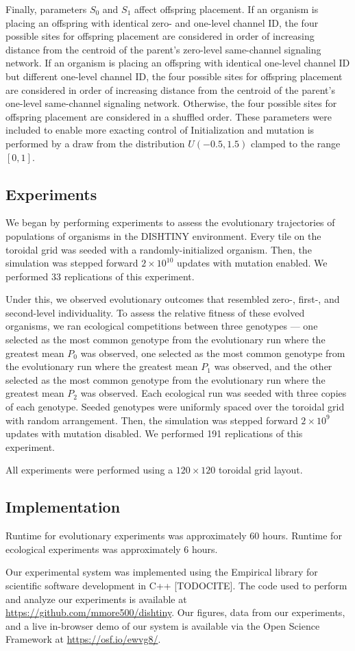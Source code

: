 Finally, parameters $S_0$ and $S_1$ affect offspring placement.
If an organism is placing an offspring with identical zero- and one-level channel ID, the four possible sites for offspring placement are considered in order of increasing distance from the centroid of the parent's zero-level same-channel signaling network.
If an organism is placing an offspring with identical one-level channel ID but different one-level channel ID, the four possible sites for offspring placement are considered in order of increasing distance from the centroid of the parent's one-level same-channel signaling network.
Otherwise, the four possible sites for offspring placement are considered in a shuffled order.
These parameters were included to enable more exacting control of
Initialization and mutation is performed by a draw from the distribution $U(-0.5,1.5)$ clamped to the range $[0,1]$.

\subsection{Experiments}

We began by performing experiments to assess the evolutionary trajectories of populations of organisms in the DISHTINY environment.
Every tile on the toroidal grid was seeded with a randomly-initialized organism.
Then, the simulation was stepped forward $2 \times 10^{10}$ updates with mutation enabled.
We performed 33 replications of this experiment.

Under this, we observed evolutionary outcomes that resembled zero-, first-, and second-level individuality.
To assess the relative fitness of these evolved organisms, we ran ecological competitions between three genotypes --- one selected as the most common genotype from the evolutionary run where the greatest mean $P_0$ was observed, one selected as the most common genotype from the evolutionary run where the greatest mean $P_1$ was observed, and the other selected as the most common genotype from the evolutionary run where the greatest mean $P_2$ was observed.
Each ecological run was seeded with three copies of each genotype.
Seeded genotypes were uniformly spaced over the toroidal grid with random arrangement.
Then, the simulation was stepped forward  $2 \times 10^{9}$ updates with mutation disabled.
We performed 191 replications of this experiment.

All experiments were performed using a  $120 \times 120$ toroidal grid layout.

\subsection{Implementation}

Runtime for evolutionary experiments was approximately 60 hours.
Runtime for ecological experiments was approximately 6 hours.

Our experimental system was implemented using the Empirical library for scientific software development in C++ [TODOCITE].
The code used to perform and analyze our experiments is available at \url{https://github.com/mmore500/dishtiny}.
Our figures, data from our experiments, and a live in-browser demo of our system is available via the Open Science Framework at \url{https://osf.io/ewvg8/}.
